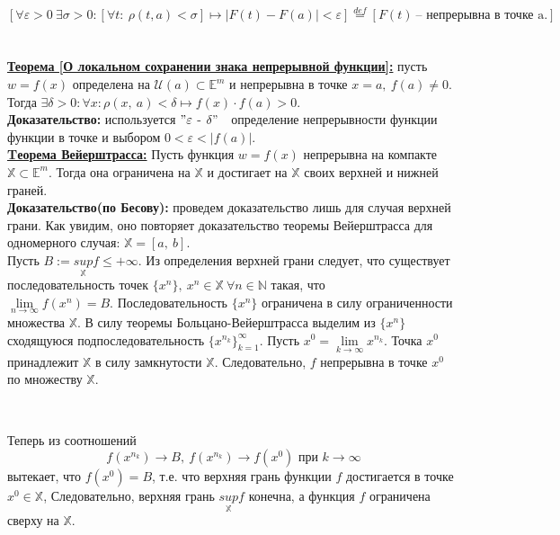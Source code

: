 \documentclass[a4paper,12pt]{article} %
\renewcommand {\leq}{\leqslant}
\begin{document}
	\[[\forall \varepsilon > 0 ~\exists\sigma > 0: [\forall t: ~\rho(t, a) < \sigma] \mapsto |F(t) - F(a)| < \varepsilon]\stackrel{def}{=} [F(t) ~\text{-- непрерывна в точке a.}]\]\\\\
	
	\underline{\textbf{Теорема [О локальном сохранении знака непрерывной функции]:}} пусть $w = f(x)$ определена на $\mathscr{U}(a) \subset \mathbb{E}^m$ и непрерывна в точке $x = a,~ f(a) \neq 0.$
	Тогда $\exists \delta > 0: \forall x: \rho(x,~ a) < \delta \mapsto f(x)\cdot f(a) > 0.$\\
	
	\textbf{Доказательство:} используется $"\varepsilon$ - $\delta"\quad$определение непрерывности функции
	функции в точке и выбором $0 < \varepsilon < |f(a)|.$\\
	
	\underline{\textbf{Tеорема Вейерштрасса:}} Пусть функция $w = f(x)$ непрерывна на
	компакте $\mathbb{X} \subset \mathbb{E}^m.$ Тогда она ограничена на $\mathbb{X}$ и достигает на $\mathbb{X}$
	своих верхней и нижней граней.\\
	
	\textbf{Доказательство(по Бесову):} проведем доказательство лишь для случая верхней грани. 
	Как увидим, оно повторяет доказательство теоремы Вейерштрасса для одномерного случая: $\mathbb{X} = [a, ~b]$.
	\\[2mm]Пусть $B := {\underset{\mathbb{X}}{sup}} f \leq +\infty$. Из определения верхней грани следует, что существует
	последовательность точек $\{x^{n}\}, ~x^{n} \in \mathbb{X} ~\forall n \in \mathbb{N}$ такая, что 
	\\[2mm]$\lim\limits_{n \to \infty}f(x^{n}) = B$. Последовательность $\{x^{n}\}$ ограничена в силу ограниченности
	множества $\mathbb{X}$. В силу теоремы Больцано-Вейерштрасса выделим из $\{x^{n}\}$ сходящуюся подпоследовательность 
	${\{x^{n_k}\}}_{k = 1}^\infty$. Пусть $x^{0} = \lim\limits_{k \to \infty} x^{n_k}$. Точка $x^{0}$ принадлежит $\mathbb{X}$
	в силу замкнутости $\mathbb{X}$. Следовательно, $f$ непрерывна в точке $x^{0}$ по множеству $\mathbb{X}$.
	
	\
	
	Теперь из соотношений 
	$$f(x^{n_k}) \to B, ~ f(x^{n_k}) \to f(x^{0}) \text{ при } k \to \infty$$ вытекает, что $f(x^{0}) = B$, т.е. что верхняя
	грань функции $f$ достигается в точке $x^{0} \in \mathbb{X}$, Следовательно, верхняя грань $\underset{\mathbb{X}}{sup}f$ конечна,
	а функция $f$ ограничена сверху на $\mathbb{X}$.
	
\end{document}
